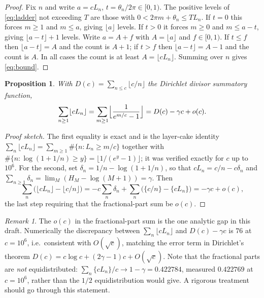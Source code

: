 \documentclass[11pt,a4paper]{article}
\newtheorem{proposition}[theorem]{Proposition}
\theoremstyle{remark}
\newtheorem{remark}[theorem]{Remark}
\begin{document}
\begin{proof}
Fix $n$ and write $a=cL_n$, $t=\theta_n/2\pi\in[0,1)$. The positive levels of \eqref{eq:ladder}
not exceeding $T$ are those with $0<2\pi m+\theta_n\le TL_n$. If $t=0$ this forces $m\ge1$ and
$m\le a$, giving $\lfloor a\rfloor$ levels. If $t>0$ it forces $m\ge0$ and $m\le a-t$, giving
$\lfloor a-t\rfloor+1$ levels. Write $a=A+f$ with $A=\lfloor a\rfloor$ and $f\in[0,1)$. If $t\le f$
then $\lfloor a-t\rfloor=A$ and the count is $A+1$; if $t>f$ then $\lfloor a-t\rfloor=A-1$ and the
count is $A$. In all cases the count is at least $A=\lfloor cL_n\rfloor$. Summing over $n$ gives
\eqref{eq:bound}.
\end{proof}

\begin{proposition}\label{prop:divisor}
With $D(c)=\sum_{n\le c}\lfloor c/n\rfloor$ the Dirichlet divisor summatory function,
\begin{equation}\label{eq:divisor}
\sum_{n\ge1}\lfloor cL_n\rfloor=\sum_{m\ge1}\Bigl\lfloor\frac{1}{e^{m/c}-1}\Bigr\rfloor
=D(c)-\gamma c+o(c).
\end{equation}
\end{proposition}

\begin{proof}[Proof sketch]
The first equality is exact and is the layer-cake identity
$\sum_n\lfloor cL_n\rfloor=\sum_{m\ge1}\#\{n:L_n\ge m/c\}$ together with
$\#\{n:\log(1+1/n)\ge y\}=\lfloor 1/(e^{y}-1)\rfloor$; it was verified exactly for
$c$ up to $10^6$. For the second, set $\delta_n=1/n-\log(1+1/n)$, so that
$cL_n=c/n-c\delta_n$ and $\sum_{n\ge1}\delta_n=\lim_M(H_M-\log(M+1))=\gamma$. Then
\[
\sum_n\bigl(\lfloor cL_n\rfloor-\lfloor c/n\rfloor\bigr)
=-c\sum_n\delta_n+\sum_n\bigl(\{c/n\}-\{cL_n\}\bigr)=-\gamma c+o(c),
\]
the last step requiring that the fractional-part sum be $o(c)$.
\end{proof}

\begin{remark}
The $o(c)$ in the fractional-part sum is the one analytic gap in this draft. Numerically the
discrepancy between $\sum_n\lfloor cL_n\rfloor$ and $D(c)-\gamma c$ is $76$ at $c=10^6$, i.e.\
consistent with $O(\sqrt c)$, matching the error term in Dirichlet's theorem
$D(c)=c\log c+(2\gamma-1)c+O(\sqrt c)$. Note that the fractional parts are \emph{not}
equidistributed: $\sum_n\{cL_n\}/c\to1-\gamma=0.422784$, measured $0.422769$ at $c=10^6$, rather
than the $1/2$ equidistribution would give. A rigorous treatment should go through this
statement.
\end{remark}
\end{document}
